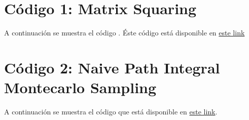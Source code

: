 \documentclass[%
 reprint,
 amsmath,amssymb,
 aps,
 pra,
]{revtex4-2}
\begin{document}
\nocite{*}




\newpage


\appendix

\begin{widetext}

\section{Código 1: Matrix Squaring\label{appx:codigo_matrix_squaring}}

A continuación se muestra el código . Éste código está disponible en \href{https://github.com/jearistiz/Statistical-Physics-Projects/blob/master/2/matrix_squaring.py}{este link}


\section{Código 2: Naive Path Integral Montecarlo Sampling\label{appx:codigo-path-int}}

A continuación se muestra el código que está disponible en \href{https://github.com/jearistiz/Statistical-Physics-Projects/blob/master/2/path_integral_naive_sampling.py}{este link}.


\end{widetext}
\end{document}
